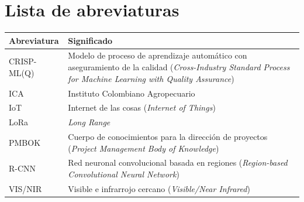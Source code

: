 
\chapter*{Lista de abreviaturas}

\renewcommand{\arraystretch}{1.3}
\begin{longtable}{@{}p{3.5cm}p{10cm}@{}}
    \toprule
    \textbf{Abreviatura} & \textbf{Significado} \\
    \midrule
    CRISP-ML(Q) & Modelo de proceso de aprendizaje automático con aseguramiento
    de la calidad (\textit{Cross-Industry Standard Process for Machine Learning
    with Quality Assurance}) \\
    ICA & Instituto Colombiano Agropecuario \\
    IoT & Internet de las cosas (\textit{Internet of Things}) \\
    LoRa & \textit{Long Range} \\
    PMBOK & Cuerpo de conocimientos para la dirección de proyectos
    (\textit{Project Management Body of Knowledge}) \\
    R-CNN & Red neuronal convolucional basada en regiones
    (\textit{Region-based Convolutional Neural Network}) \\
    VIS/NIR & Visible e infrarrojo cercano (\textit{Visible/Near Infrared}) \\
    \bottomrule
\end{longtable}
